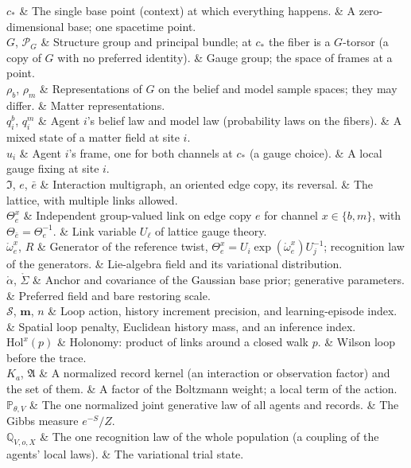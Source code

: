 \begin{decoder}
$c_*$ & The single base point (context) at which everything happens. & A zero-dimensional base; one spacetime point. \\
$G$, $\mathscr P_G$ & Structure group and principal bundle; at $c_*$ the fiber is a $G$-torsor (a copy of $G$ with no preferred identity). & Gauge group; the space of frames at a point. \\
$\rho_b$, $\rho_m$ & Representations of $G$ on the belief and model sample spaces; they may differ. & Matter representations. \\
$q_i^b$, $q_i^m$ & Agent $i$'s belief law and model law (probability laws on the fibers). & A mixed state of a matter field at site $i$. \\
$u_i$ & Agent $i$'s frame, one for both channels at $c_*$ (a gauge choice). & A local gauge fixing at site $i$. \\
$\mathfrak I$, $e$, $\bar e$ & Interaction multigraph, an oriented edge copy, its reversal. & The lattice, with multiple links allowed. \\
$\Theta^x_e$ & Independent group-valued link on edge copy $e$ for channel $x\in\{b,m\}$, with $\Theta_{\bar e}=\Theta_e^{-1}$. & Link variable $U_\ell$ of lattice gauge theory. \\
$\mathring\omega^x_e$, $R$ & Generator of the reference twist, $\Theta^x_e=U_i\exp(\mathring\omega^x_e)U_j^{-1}$; recognition law of the generators. & Lie-algebra field and its variational distribution. \\
$\mathring\alpha$, $\mathring\Sigma$ & Anchor and covariance of the Gaussian base prior; generative parameters. & Preferred field and bare restoring scale. \\
$\mathscr S$, $\mathbf m$, $n$ & Loop action, history increment precision, and learning-episode index. & Spatial loop penalty, Euclidean history mass, and an inference index. \\
$\mathrm{Hol}^x(p)$ & Holonomy: product of links around a closed walk $p$. & Wilson loop before the trace. \\
$K_a$, $\mathfrak A$ & A normalized record kernel (an interaction or observation factor) and the set of them. & A factor of the Boltzmann weight; a local term of the action. \\
$\mathbb P_{\theta,V}$ & The one normalized joint generative law of all agents and records. & The Gibbs measure $e^{-S}/Z$. \\
$\mathbb Q_{V,o,X}$ & The one recognition law of the whole population (a coupling of the agents' local laws). & The variational trial state. \\

\end{decoder}

